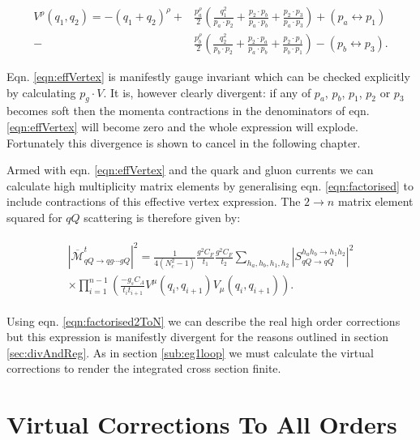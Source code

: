 		\begin{align}
			V^\rho(q_1, q_2) = -(q_1 + q_2)^\rho +
			&\frac{p_a^\rho}{2}\left(\frac{q^2_1}{p_a\cdot p_2} + \frac{p_2 \cdot p_b}{p_a \cdot p_b} + \frac{p_2 \cdot p_3}{p_a \cdot p_3}\right) + (p_a\leftrightarrow p_1) \\
			- &\frac{p_b^\rho}{2}\left(\frac{q^2_2}{p_b\cdot p_2} + \frac{p_2 \cdot p_a}{p_a \cdot p_b} + \frac{p_2 \cdot p_1}{p_b \cdot p_1}\right) - (p_b\leftrightarrow p_3).
			\label{eqn:effVertex}
		\end{align}

		Eqn. \eqref{eqn:effVertex} is manifestly gauge invariant which can be checked explicitly by
		calculating $p_g\cdot V$.  It is, however clearly divergent:  if any of $p_a$, $p_b$, $p_1$,
		$p_2$ or $p_3$ becomes soft then the momenta contractions in the denominators of eqn.
		\eqref{eqn:effVertex} will become zero and the whole expression will explode.  Fortunately
		this divergence is shown to cancel in the following chapter.

		Armed with eqn. \eqref{eqn:effVertex} and the quark and gluon
		currents we can calculate high multiplicity matrix elements by generalising eqn.
		\eqref{eqn:factorised} to include contractions of this effective vertex expression.  The
		$2\rightarrow n$ matrix element squared for $qQ$ scattering is therefore given by:

		\begin{align}
		\begin{split}
			|\overline{\mathcal{M}}^t_{qQ\rightarrow qg\cdots gQ}|^2 = \frac{1}{4(N_c^2-1)}
			\frac{g^2C_F}{t_1}\frac{g^2C_F}{t_2} \sum_{h_a, h_b, h_1, h_2}
			|S_{qQ\rightarrow qQ}^{h_ah_b\rightarrow h_1h_2}|^2\\
			\times\prod_{i=1}^{n-1}\left(\frac{-g_sC_A}{t_it_{i+1}}V^\mu(q_i, q_{i+1})V_\mu(q_i, q_{i+1})\right).
			\label{eqn:factorised2ToN}
		\end{split}
		\end{align}

		Using eqn. \eqref{eqn:factorised2ToN} we can describe the real high order corrections
		but this expression is manifestly divergent for the reasons outlined in section
		\ref{sec:divAndReg}.  As in section \ref{sub:eg1loop} we must calculate the virtual
		corrections to render the integrated cross section finite.

	\section{Virtual Corrections To All Orders}
		\label{sub:virtuals}

